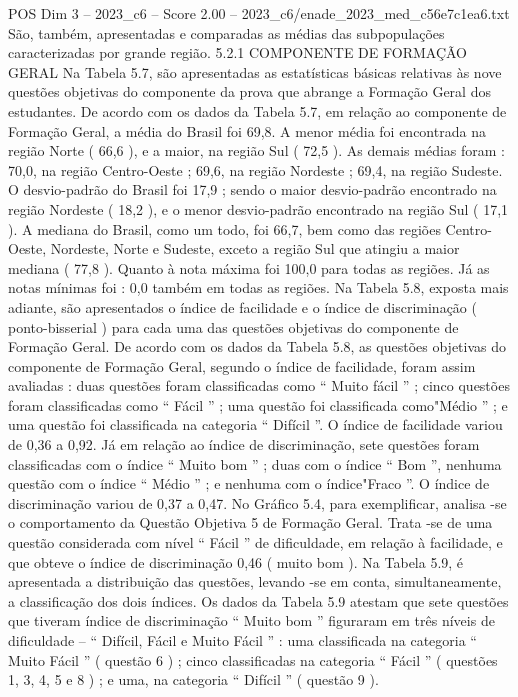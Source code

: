 \begin{textsample}{POS Dim 3 – 2023\_c6 – Score 2.00 – 2023\_c6/enade\_2023\_med\_c56e7c1ea6.txt}
São, também, apresentadas e comparadas as médias das subpopulações caracterizadas por grande região. 5.2.1 COMPONENTE DE FORMAÇÃO GERAL Na Tabela 5.7, são apresentadas as estatísticas básicas relativas às nove questões objetivas do componente da prova que abrange a Formação Geral dos estudantes.
De acordo com os dados da Tabela 5.7, em relação ao componente de Formação Geral, a média do Brasil foi 69,8.
A menor média foi encontrada na região Norte ( 66,6 ), e a maior, na região Sul ( 72,5 ).
As demais médias foram : 70,0, na região Centro-Oeste ; 69,6, na região Nordeste ; 69,4, na região Sudeste.
O desvio-padrão do Brasil foi 17,9 ; sendo o maior desvio-padrão encontrado na região Nordeste ( 18,2 ), e o menor desvio-padrão encontrado na região Sul ( 17,1 ).
A mediana do Brasil, como um todo, foi 66,7, bem como das regiões Centro-Oeste, Nordeste, Norte e Sudeste, exceto a região Sul que atingiu a maior mediana ( 77,8 ).
Quanto à nota máxima foi 100,0 para todas as regiões.
Já as notas mínimas foi : 0,0 também em todas as regiões.
Na Tabela 5.8, exposta mais adiante, são apresentados o índice de facilidade e o índice de discriminação ( ponto-bisserial ) para cada uma das questões objetivas do componente de Formação Geral.
De acordo com os dados da Tabela 5.8, as questões objetivas do componente de Formação Geral, segundo o índice de facilidade, foram assim avaliadas : duas questões foram classificadas como “ Muito fácil ” ; cinco questões foram classificadas como “ Fácil ” ; uma questão foi classificada como"Médio ” ; e uma questão foi classificada na categoria “ Difícil ”.
O índice de facilidade variou de 0,36 a 0,92.
Já em relação ao índice de discriminação, sete questões foram classificadas com o índice “ Muito bom ” ; duas com o índice “ Bom ”, nenhuma questão com o índice “ Médio ” ; e nenhuma com o índice"Fraco ”.
O índice de discriminação variou de 0,37 a 0,47.
No Gráfico 5.4, para exemplificar, analisa -se o comportamento da Questão Objetiva 5 de Formação Geral.
Trata -se de uma questão considerada com nível “ Fácil ” de dificuldade, em relação à facilidade, e que obteve o índice de discriminação 0,46 ( muito bom ).
Na Tabela 5.9, é apresentada a distribuição das questões, levando -se em conta, simultaneamente, a classificação dos dois índices.
Os dados da Tabela 5.9 atestam que sete questões que tiveram índice de discriminação “ Muito bom ” figuraram em três níveis de dificuldade – “ Difícil, Fácil e Muito Fácil ” : uma classificada na categoria “ Muito Fácil ” ( questão 6 ) ; cinco classificadas na categoria “ Fácil ” ( questões 1, 3, 4, 5 e 8 ) ; e uma, na categoria “ Difícil ” ( questão 9 ).

\end{textsample}
